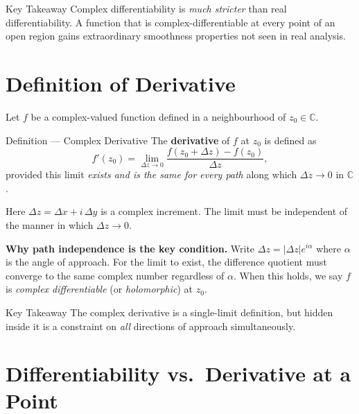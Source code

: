 \documentclass[12pt,a4paper]{article}
\begin{document}
\begin{learnbox}{Key Takeaway}
Complex differentiability is \emph{much stricter} than real differentiability.
A function that is complex-differentiable at every point of an open region gains
extraordinary smoothness properties not seen in real analysis.
\end{learnbox}

\section{Definition of Derivative}

Let $f$ be a complex-valued function defined in a neighbourhood of $z_0 \in \mathbb{C}$.

\begin{infobox}{Definition --- Complex Derivative}
The \textbf{derivative} of $f$ at $z_0$ is defined as
\[
  f'(z_0) = \lim_{\Delta z \to 0} \frac{f(z_0 + \Delta z) - f(z_0)}{\Delta z},
\]
provided this limit \emph{exists and is the same for every path} along which
$\Delta z \to 0$ in $\mathbb{C}$.

\medskip
\noindent Here $\Delta z = \Delta x + i\,\Delta y$ is a complex increment.
The limit must be independent of the manner in which $\Delta z \to 0$.
\end{infobox}

\noindent\textbf{Why path independence is the key condition.}
Write $\Delta z = |\Delta z|e^{i\alpha}$ where $\alpha$ is the angle of approach.
For the limit to exist, the difference quotient must converge to the same complex number
regardless of $\alpha$. When this holds, we say $f$ is \emph{complex differentiable}
(or \emph{holomorphic}) at $z_0$.

\begin{learnbox}{Key Takeaway}
The complex derivative is a single-limit definition, but hidden inside it is a
constraint on \emph{all} directions of approach simultaneously.
\end{learnbox}

\section{Differentiability vs.\ Derivative at a Point}
\end{document}
